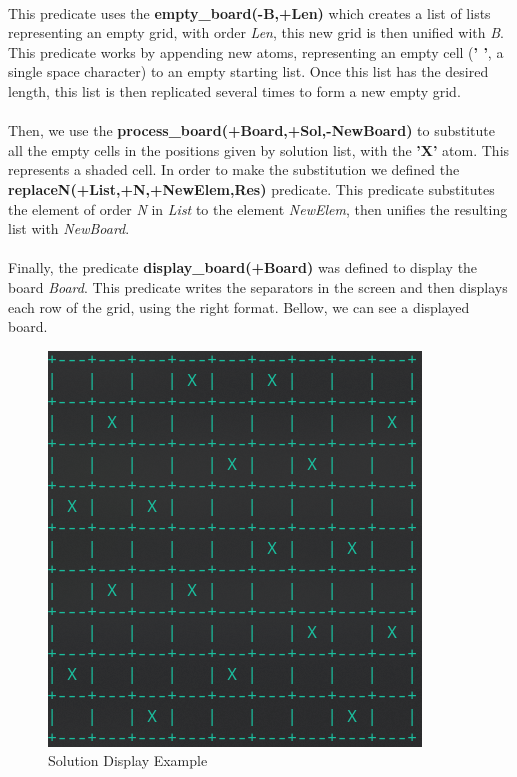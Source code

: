 \documentclass[runningheads]{llncs}
\begin{document}
\paragraph{}
This predicate uses the \textbf{empty\_board(-B,+Len)} which creates a list of lists representing an empty grid, with order \textit{Len},
this new grid is then unified with \textit{B}. This predicate works by appending new atoms, representing an empty cell (\textbf{' '}, 
a single space character) to an empty starting list. Once this list has the desired length, this list is then replicated 
several times to form a new empty grid.

\paragraph{}
Then, we use the \textbf{process\_board(+Board,+Sol,-NewBoard)} to substitute all the empty cells in the positions given
by solution list, with the \textbf{'X'} atom. This represents a shaded cell. In order to make the substitution we defined
the \textbf{replaceN(+List,+N,+NewElem,Res)} predicate. This predicate substitutes the element of order \textit{N} in 
\textit{List} to the element \textit{NewElem}, then unifies the resulting list with \textit{NewBoard}.

\paragraph{}
Finally, the predicate \textbf{display\_board(+Board)} was defined to display the board \textit{Board}. This predicate
writes the separators in the screen and then displays each row of the grid, using the right format. Bellow, we can see a
displayed board.
    
\begin{figure}
    \begin{center}
        \includegraphics[scale=0.5]{images/fig2.png}
        \caption{Solution Display Example} \label{fig2}
    \end{center}
\end{figure}
    
\end{document}

